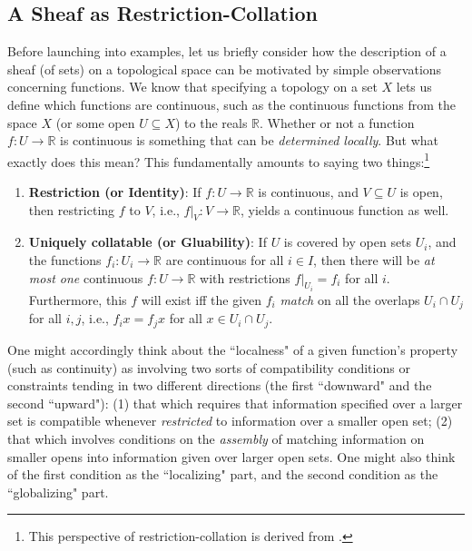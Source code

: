 \documentclass[a4paper]{book}
\theoremstyle{definition}
\theoremstyle{definition}
\theoremstyle{definition}
\theoremstyle{theorem}
\theoremstyle{definition}
\begin{document}
\subsection{A Sheaf as Restriction-Collation}
\label{sec: restrict}
Before launching into examples, let us briefly consider how the description of a sheaf (of sets) on a topological space can be motivated by simple observations concerning functions. We know that specifying a topology on a set $X$ lets us define which functions are continuous, such as the continuous functions from the space $X$ (or some open $U \subseteq  X$) to the reals $\mathbb{R}$. Whether or not a function $f: U \rightarrow \mathbb{R}$ is continuous is something that can be \textit{determined locally}. But what exactly does this mean? This fundamentally amounts to saying two things:\footnote{This perspective of restriction-collation is derived from \cite{maclane_sheaves_1994}.}     
\begin{enumerate}
	\item \textbf{Restriction (or Identity)}: If $f: U \rightarrow \mathbb{R}$ is continuous, and $V \subseteq U$ is open, then restricting $f$ to $V$, i.e., $f|_V : V \rightarrow \mathbb{R}$, yields a continuous function as well.   
	\item \textbf{Uniquely collatable (or Gluability)}: If $U$ is covered by open sets $U_i$, and the functions $f_i: U_i \rightarrow \mathbb{R}$ are continuous for all $i \in I$, then there will be \textit{at most one} continuous $f: U \rightarrow \mathbb{R}$ with restrictions $f |_{U_i} = f_i$ for all $i$. Furthermore, this $f$ will exist iff the given $f_i$ \textit{match} on all the overlaps $U_i \cap U_j$ for all $i, j$, i.e., $f_i x = f_j x$ for all $x \in U_i \cap U_j$.
\end{enumerate}  
\noindent 
One might accordingly think about the ``localness" of a given function's property (such as continuity) as involving two sorts of compatibility conditions or constraints tending in two different directions (the first ``downward" and the second ``upward"): (1) that which requires that information specified over a larger set is compatible whenever \textit{restricted} to information over a smaller open set; (2) that which involves conditions on the \textit{assembly} of matching information on smaller opens into information given over larger open sets. One might also think of the first condition as the ``localizing" part, and the second condition as the ``globalizing" part. \par 
\end{document}

